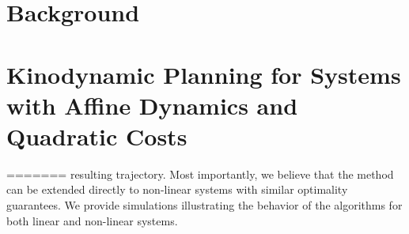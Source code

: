 \documentclass[letterpaper, 10pt, english, conference]{IEEEtran}
\begin{document}
\section{Background}



\section{Kinodynamic Planning for Systems with Affine Dynamics and Quadratic Costs}
=======
resulting trajectory. Most importantly, we believe that the method can
be extended directly to non-linear systems with similar optimality
guarantees. We provide simulations illustrating the behavior of the
algorithms for both linear and non-linear systems.





\end{document}

